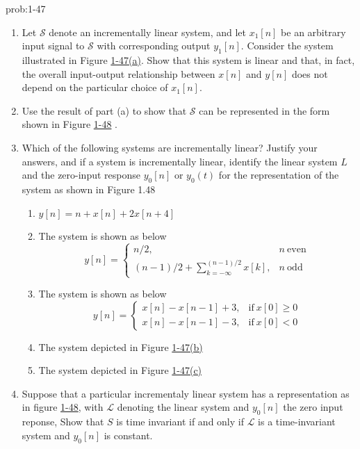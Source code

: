 \documentclass[koma,a4paper,utopia,12pt,listings-color,microtype,paralist,colorlinks,urlcolor=red]{org-article}
\begin{document}
\begin{prob}[]{prob:1-47}
\begin{enumerate}
\item Let \(\mathcal{S}\) denote an incrementally linear system, and let
\(x_{1}[n]\) be an arbitrary input signal to \(\mathcal{S}\) with
corresponding output \(y_{1}[n]\).  Consider the system illustrated in
Figure \hyperref[figProb1-47a]{1-47(a)}.  Show that this system is linear and that, in fact, the overall
input-output relationship between \(x[n]\) and \(y[n]\) does not depend
on the particular choice of \(x_{1}[n]\).
\item Use the result of part (a) to show that \(\mathcal{S}\) can be
represented in the form shown in Figure  \hyperref[figProb1-47d]{1-48} .
\item Which of the following systems are incrementally linear? Justify your
answers, and if a system is incrementally linear, identify the linear
system \(L\) and the zero-input response \(y_{0}[n]\) or \(y_{0}(t)\) for
the representation of the system as shown in Figure 1.48
\begin{enumerate}
\item \(y[n] = n + x[n] + 2x[n+4]\)
\item The system is shown as below
\begin{equation*}
y[n] =
\begin{cases}
n/2, & n\ \mathrm{even}\\
(n-1)/2 + \sum_{k=-\infty}^{(n-1)/2} x[k],& n\ \mathrm{odd}
\end{cases}
\end{equation*}

\item The system is shown as below
\begin{equation*}
y[n] =
\begin{cases}
x[n] - x[n-1]  + 3, & \mathrm{if}\ x[0] \geq 0 \\
x[n] - x[n-1]  - 3, & \mathrm{if}\ x[0] < 0
\end{cases}
\end{equation*}
\item The system depicted in Figure \hyperref[figProb1-47b]{1-47(b)}
\item The system depicted in Figure  \hyperref[figProb1-47c]{1-47(c)}
\end{enumerate}
\item Suppose that a particular incrementaly linear system has a representation
as in figure  \hyperref[figProb1-47d]{1-48}, with \(\mathcal{L}\) denoting the linear system and
\(y_{0}[n]\) the zero input reponse, Show that \(S\) is time invariant if
and only if \(\mathcal{L}\) is a time-invariant system and \(y_{0}[n]\) is constant.
\end{enumerate}



\end{prob}
\end{document}
